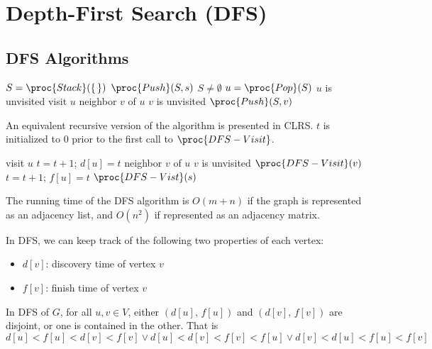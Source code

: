 \section{Depth-First Search (DFS)} 

\subsection{DFS Algorithms}

\begin{codebox}
    \li $S = \proc{Stack}(\{ \, \})$ 
    \li $\proc{Push}(S,s)$ 
    \li \While $S \neq \emptyset$ \Do
        \li $u = \proc{Pop}(S)$
        \li \If $u$ is unvisited \Then
            \li visit $u$
            \li {} neighbor $v$ of $u$ \Do
                \li \If $v$ is unvisited \Then
                    \li $\proc{Push}(S,v)$   
\end{codebox}

An equivalent recursive version of the algorithm is presented in CLRS. $t$ is initialized to 0 prior to the first call to $\proc{DFS-Visit}$.

\begin{codebox}
    \li visit $u$ 
    \li $t = t + 1$;\; $d[u] = t$ 
    \li {} neighbor $v$ of $u$ \Do
        \li \If $v$ is unvisited \Then
            \li $\proc{DFS-Visit}(v)$ 
            \End
        \End
    \li $t = t + 1$;\; $f[u] = t$
    \li $\proc{DFS-Vist}(s)$
\end{codebox}

The running time of the DFS algorithm is $O(m+n)$ if the graph is represented as an adjacency list, and $O(n^2)$ if represented as an adjacency matrix.

In DFS, we can keep track of the following two properties of each vertex:
\begin{itemize}
    \item $d[v]$: discovery time of vertex $v$ 
    \item $f[v]$: finish time of vertex $v$
\end{itemize}

\begin{theorem} 
    In DFS of $G$, for all $u,v \in V$, either $(d[u],\, f[u])$ and $(d[v],\, f[v])$ are disjoint, or one is contained in the other. That is
    $$
    d[u] < f[u] < d[v] < f[v] \lor d[u] < d[v] < f[v] < f[u] \lor d[v] < d[u] < f[u] < f[v]
    $$
\end{theorem}

